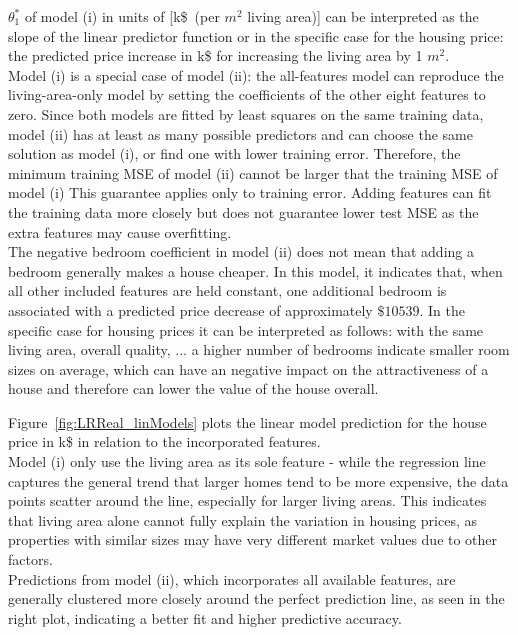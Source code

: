 \documentclass[11pt,a4paper]{article}
\begin{document}
\vspace{0.5em}
\noindent $\theta_1^*$ of model (i) in units of [k\$\ (per $m^2$ living area)] can be interpreted as the slope of the linear predictor function 
or in the specific case for the housing price: the predicted price increase in k\$ for increasing the living area by 1 $m^2$.
\vspace{1em}
\\
\noindent Model (i) is a special case of model (ii): the all-features model can reproduce the living-area-only model by setting the coefficients 
of the other eight features to zero. 
Since both models are fitted by least squares on the same training data, model (ii) has at least as many possible predictors and can 
choose the same solution as model (i), or find one with lower training error. 
Therefore, the minimum training MSE of model (ii) cannot be larger that the training MSE of model (i)
This guarantee applies only to training error. Adding features can fit the training data more closely but does not guarantee lower test MSE as
the extra features may cause overfitting.
\vspace{1em}
\\
\noindent The negative bedroom coefficient in model (ii) does not mean that adding a bedroom generally makes a house cheaper. 
In this model, it indicates that, when all other included features are held constant, one additional bedroom is associated with a predicted price decrease of approximately $\$10539$.
In the specific case for housing prices it can be interpreted as follows: with the same living area, overall quality, ... a higher number of bedrooms indicate smaller room sizes on average, which can have an negative impact on the attractiveness of a house and therefore can lower the value of the house overall.

\clearpage

\noindent Figure~\ref{fig:LRReal_linModels} plots the linear model prediction for the house price in k\$ in relation to the incorporated features.
\\Model (i) only use the living area as its sole feature - while the regression line captures the general trend that larger homes tend to be more expensive, the data points scatter around the line, especially for larger living areas. 
This indicates that living area alone cannot fully explain the variation in housing prices, as properties with similar sizes may have very different market values due to other factors.
\\ Predictions from model (ii), which incorporates all available features, are generally clustered more closely around the perfect prediction line, as seen in the right plot, indicating a better fit and higher predictive accuracy.
\end{document}
